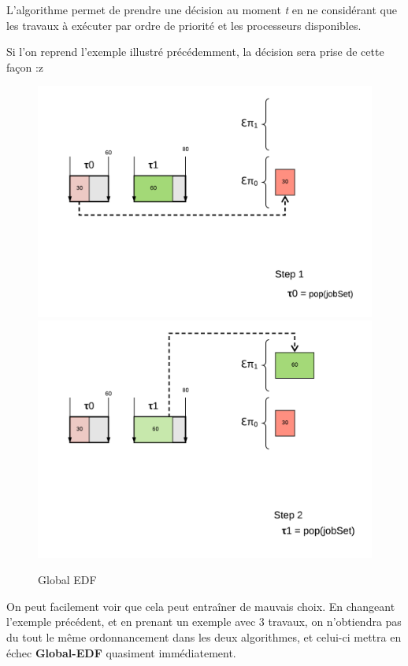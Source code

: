 	L'algorithme permet de prendre une décision au moment \textit{t} en ne considérant 
	que les travaux à exécuter par ordre de priorité et les processeurs disponibles.
	
	Si l'on reprend l'exemple illustré précédemment, la décision sera prise de cette façon :z
	
	\begin{figure}[H]
		\includegraphics[scale=0.5]{img/gedf/gedf}
		\includegraphics[scale=0.5]{img/gedf/gedf2}
		\caption{Global EDF}
	\end{figure}
	 
	On peut facilement voir que cela peut entraîner de \og{}mauvais choix\fg{}. 
	En changeant l'exemple précédent, et en prenant un exemple avec 3 travaux, 
	on n'obtiendra pas du tout le même ordonnancement dans les deux algorithmes, 
	et celui-ci mettra en échec \textbf{Global-EDF} quasiment immédiatement.\newline
	
